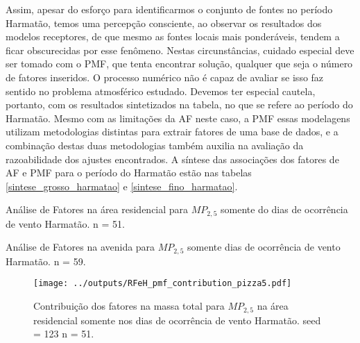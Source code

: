 Assim, apesar do esforço para identificarmos o conjunto de fontes no período 
Harmatão, temos uma percepção consciente, ao observar os resultados dos modelos 
receptores, de que mesmo as fontes locais mais ponderáveis, tendem a ficar 
obscurecidas por esse fenômeno. Nestas circunstâncias, cuidado especial deve 
ser tomado com o PMF, que tenta encontrar solução, qualquer que seja o número 
de fatores inseridos. O processo numérico não
é capaz de avaliar se isso faz sentido no problema atmosférico estudado. 
Devemos ter especial cautela, portanto, com os resultados sintetizados na 
tabela, no que se refere ao período do Harmatão. Mesmo com as limitações da 
AF neste caso, a PMF essas modelagens utilizam metodologias distintas para 
extrair fatores de uma base de dados, e a combinação destas duas 
metodologias também auxilia na avaliação da razoabilidade dos ajustes 
encontrados. A síntese das associações dos fatores de AF e PMF para o período do Harmatão 
estão nas tabelas \ref{sintese_grosso_harmatao} e \ref{sintese_fino_harmatao}.

\newpage
\begin{table}[H]
  \centering
  \caption{Análise de Fatores na área residencial para $MP_{2,5}$
           somente do dias de ocorrência de vento Harmatão. n = 51.
          \label{table:AF_RFeH5}}
  

\end{table}

\begin{table}[H]
  \centering
  \caption{Análise de Fatores na avenida para $MP_{2,5}$
           somente dias de ocorrência de vento Harmatão. n = 59.
          \label{table:AF_TFeH5}}
  

\end{table}

\begin{landscape}
  \begin{figure}
    \centering
    \begin{minipage}[b]{0.45\linewidth}
      \texttt{[image: ../outputs/RFeH\_pmf\_contribution\_pizza5.pdf]}
      \caption{Contribuição dos fatores na massa total para $MP_{2,5}$ na área
               residencial somente nos dias de ocorrência de vento Harmatão. seed = 123 n = 51.
               \label{fig:RFeH_contribution5}}
    \end{minipage}%
    \hspace{0.5cm}
    \begin{minipage}[b]{0.45\linewidth}
      

    \end{minipage}
  \end{figure}
\end{landscape}

